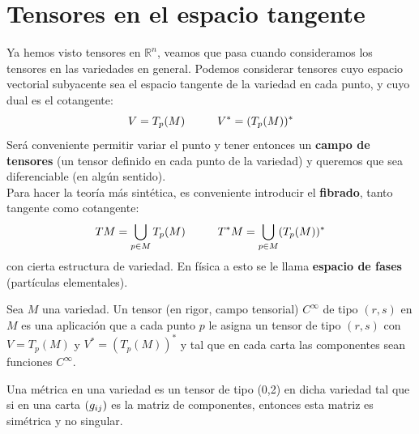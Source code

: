 \documentclass[palatino, bibnumbers]{apuntes}
\begin{document}
\section{Tensores en el espacio tangente}
Ya hemos visto tensores en $ℝ^{n}$, veamos que pasa cuando consideramos los tensores en las variedades en general. Podemos considerar tensores cuyo espacio vectorial subyacente sea el espacio tangente de la variedad en cada punto, y cuyo dual es el cotangente: $$V=T_p(M)\hspace*{1cm} V^*=(T_p(M))^*$$
Será conveniente permitir variar el punto y tener entonces un \textbf{campo de tensores} (un tensor definido en cada punto de la variedad) y queremos que sea diferenciable (en algún sentido).\\ 
Para hacer la teoría más sintética, es conveniente introducir el \textbf{fibrado}, tanto tangente como cotangente: $$TM=\bigcup\limits_{p\in M} T_p(M)\hspace*{1cm} T^*M=\bigcup\limits_{p\in M} (T_p(M))^* $$ con cierta estructura de variedad. En física a esto se le llama \textbf{espacio de fases} (partículas elementales).

\begin{defn} Sea $M$ una variedad. Un tensor (en rigor, campo tensorial) $C^{\infty}$ de tipo $(r,s)$ en $M$ es una aplicación que a cada punto $p$ le asigna un tensor de tipo $(r,s)$ con $V=T_p(M)$ y $V^*=(T_p(M))^*$ y tal que en cada carta las componentes sean funciones $C^{\infty}$.
\end{defn}

\begin{defn}[Métrica] Una métrica en una variedad es un tensor de tipo (0,2) en dicha variedad tal que si en una carta $(g_{i\space j})$ es la matriz de componentes, entonces esta matriz es simétrica y no singular.
\end{defn}
\end{document}
